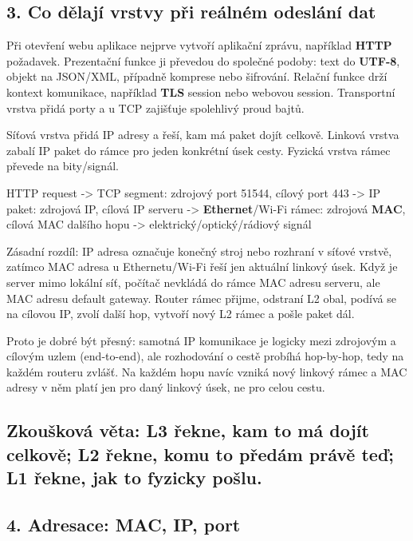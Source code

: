 
\subsection*{3. Co dělají vrstvy při reálném odeslání dat}

Při otevření webu aplikace nejprve vytvoří aplikační zprávu, například \textbf{HTTP} požadavek. Prezentační funkce ji převedou do společné podoby: text do \textbf{UTF-8}, objekt na JSON/XML, případně komprese nebo šifrování. Relační funkce drží kontext komunikace, například \textbf{TLS} session nebo webovou session. Transportní vrstva přidá porty a u TCP zajišťuje spolehlivý proud bajtů.

Síťová vrstva přidá IP adresy a řeší, kam má paket dojít celkově. Linková vrstva zabalí IP paket do rámce pro jeden konkrétní úsek cesty. Fyzická vrstva rámec převede na bity/signál.

HTTP request -> TCP segment: zdrojový port 51544, cílový port 443 -> IP paket: zdrojová IP, cílová IP serveru -> \textbf{Ethernet}/Wi-Fi rámec: zdrojová \textbf{MAC}, cílová MAC dalšího hopu -> elektrický/optický/rádiový signál

Zásadní rozdíl: IP adresa označuje konečný stroj nebo rozhraní v síťové vrstvě, zatímco MAC adresa u Ethernetu/Wi-Fi řeší jen aktuální linkový úsek. Když je server mimo lokální síť, počítač nevkládá do rámce MAC adresu serveru, ale MAC adresu default gateway. Router rámec přijme, odstraní L2 obal, podívá se na cílovou IP, zvolí další hop, vytvoří nový L2 rámec a pošle paket dál.

Proto je dobré být přesný: samotná IP komunikace je logicky mezi zdrojovým a cílovým uzlem (end-to-end), ale rozhodování o cestě probíhá hop-by-hop, tedy na každém routeru zvlášť. Na každém hopu navíc vzniká nový linkový rámec a MAC adresy v něm platí jen pro daný linkový úsek, ne pro celou cestu.

\subsection*{Zkoušková věta: L3 řekne, kam to má dojít celkově; L2 řekne, komu to předám právě teď; L1 řekne, jak to fyzicky pošlu.}

\subsection*{4. Adresace: MAC, IP, port}

